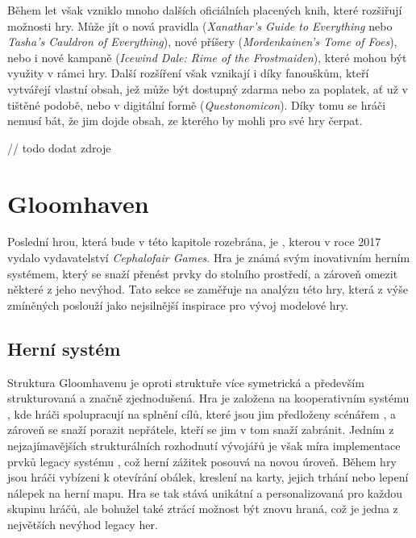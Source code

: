 Během let však vzniklo mnoho dalších oficiálních placených knih, které rozšiřují možnosti hry. Může jít o nová pravidla (\textit{Xanathar's Guide to Everything} nebo \textit{Tasha's Cauldron of Everything}), nové příšery (\textit{Mordenkainen's Tome of Foes}), nebo i nové kampaně (\textit{Icewind Dale: Rime of the Frostmaiden}), které mohou být využity v rámci hry. Další rozšíření však vznikají i díky fanouškům, kteří vytvářejí vlastní obsah, jež může být dostupný zdarma nebo za poplatek, ať už v tištěné podobě, nebo v digitální formě (\textit{Questonomicon}). Díky tomu se hráči nemusí bát, že jim dojde obsah, ze kterého by mohli pro své hry čerpat.

// todo dodat zdroje



\section{Gloomhaven}
\label{sec:gloomhaven}

Poslední hrou, která bude v této kapitole rozebrána, je , kterou v roce 2017 vydalo vydavatelství \textit{Cephalofair Games}. Hra je známá svým inovativním herním systémem, který se snaží přenést prvky \dnd{} do stolního prostředí, a zároveň omezit některé z jeho nevýhod. Tato sekce se zaměřuje na analýzu této hry, která z výše zmíněných poslouží jako nejsilnější inspirace pro vývoj modelové hry.

\subsection{Herní systém}
\label{subsec:gh_gameplay}

Struktura Gloomhavenu je oproti struktuře \dnd{} více symetrická a především strukturovaná a značně zjednodušená. Hra je založena na kooperativním systému , kde hráči spolupracují na splnění cílů, které jsou jim předloženy scénářem , a zároveň se snaží porazit nepřátele, kteří se jim v tom snaží zabránit. Jedním z nejzajímavějších strukturálních rozhodnutí vývojářů je však míra implementace prvků legacy systému , což herní zážitek posouvá na novou úroveň. Během hry jsou hráči vybízeni k otevírání obálek, kreslení na karty, jejich trhání nebo lepení nálepek na herní mapu. Hra se tak stává unikátní a personalizovaná pro každou skupinu hráčů, ale bohužel také ztrácí možnost být znovu hraná, což je jedna z největších nevýhod legacy her.

